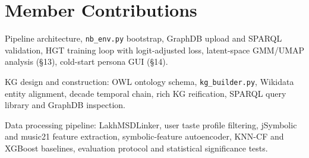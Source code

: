 \section{Member Contributions}
\label{sec:contributions}

\begin{description}\setlength\itemsep{2pt}
  \item[\normalfont\textbf{Pedro Fanica (54346)}] Pipeline architecture, \texttt{nb\_env.py} bootstrap, GraphDB upload and SPARQL validation, HGT training loop with logit-adjusted loss, latent-space GMM/UMAP analysis (\S13), cold-start persona GUI (\S14).

  \item[\normalfont\textbf{Aarthi Perumpillichira (66404)}] KG design and construction: OWL ontology schema, \texttt{kg\_builder.py}, Wikidata entity alignment, decade temporal chain, rich KG reification, SPARQL query library and GraphDB inspection.

  \item[\normalfont\textbf{Maja Skwaroń (66083)}] Data processing pipeline: LakhMSDLinker, user taste profile filtering, jSymbolic and music21 feature extraction, symbolic-feature autoencoder, KNN-CF and XGBoost baselines, evaluation protocol and statistical significance tests.
\end{description}